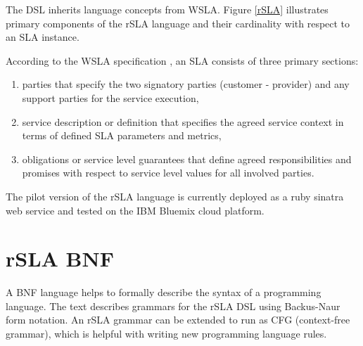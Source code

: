\documentclass{llncs}
\begin{document}
The DSL inherits language concepts from WSLA. Figure \ref{rSLA} illustrates primary components of the rSLA language and their cardinality with respect to an SLA instance. 

%        
%       

According to the WSLA specification \cite{wsla}, an SLA consists of three primary sections:
\begin{enumerate}
\item parties that specify the two signatory parties (customer - provider) and any support parties for the service execution,
\item service description or definition that specifies the agreed service context in terms of defined SLA parameters and metrics,
\item obligations or service level guarantees that define agreed responsibilities and promises with respect to service level values for all involved parties.
\end{enumerate}

The pilot version of the rSLA language is currently deployed as a ruby sinatra web service and tested on the IBM Bluemix cloud platform.

\section{rSLA BNF }

 A BNF language helps to formally describe the syntax of a programming language. The text describes grammars for the rSLA DSL using Backus-Naur form notation. An rSLA grammar can be extended to run as CFG (context-free grammar), which is helpful with writing new programming language rules.
\end{document}
